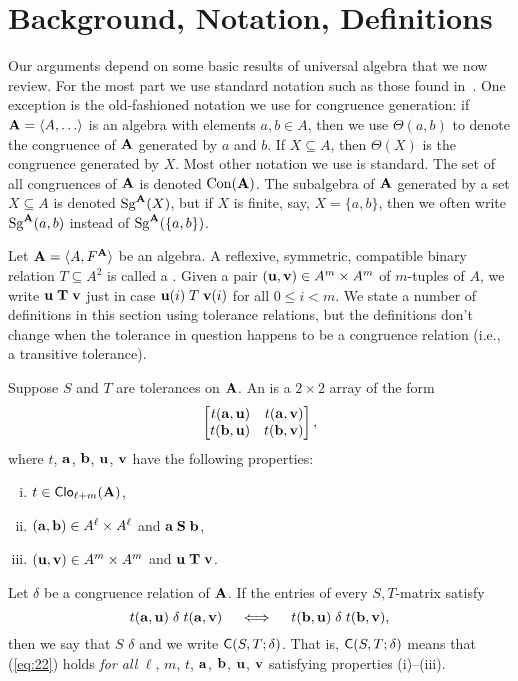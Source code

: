 \section{Background, Notation, Definitions}
\label{sec:definitions}
Our arguments depend on some basic results of universal algebra that we now review.
For the most part we use standard notation such as those found in~\cite{MR2839398}.
One exception is the old-fashioned notation we use for
congruence generation:
if $\bA =\<A, \dots\>$ is an algebra with elements 
$a, b \in A$, then we use $\Theta(a,b)$ to denote
the congruence of $\mathbf{A}$ generated by $a$ and $b$. If $X\subseteq A$,
then $\Theta(X)$ is the congruence generated by $X$.  
\renewcommand{\Cg}{\ensuremath{\Theta}}
Most other notation we use is standard.  The set of all congruences of $\mathbf{A}$ is
denoted $\operatorname{Con}(\mathbf{A})$. The subalgebra of $\mathbf{A}$ generated by a set $X \subseteq A$ 
is denoted $\operatorname{Sg}^{\mathbf{A}}(X)$, but if $X$ is finite, say, $X = \{a,b\}$, then we
often write $\operatorname{Sg}^{\mathbf{A}}(a,b)$ instead of $\operatorname{Sg}^{\mathbf{A}}(\{a,b\})$.


Let $\mathbf{A} = \langle A, F^{\mathbf{A}}\rangle$ be an algebra.
A reflexive, symmetric, compatible binary relation $T\subseteq A^2$ is called a
.  
Given a pair $(\mathbf{u}, \mathbf{v}) \in A^m\times A^m$ of $m$-tuples of $A$, we write 
$\mathbf{u} \mathrel{\mathbf{T}} \mathbf{v}$ just in case $\mathbf{u}(i) \mathrel{T} \mathbf{v}(i)$ for all $0\leq i<m$. 
We state a number of definitions in this section using tolerance relations, but 
the definitions don't change when the tolerance in question happens to be
a congruence relation (i.e., a transitive tolerance).

Suppose $S$ and $T$ are tolerances on $\mathbf{A}$.  An  
is a $2\times 2$ array of the form
\[
\begin{bmatrix*}[r] t(\ba,\bu) & t(\ba,\bv)\\ t(\bb,\bu)&t(\bb,\bv)\end{bmatrix*},
\]
where $t$, $\mathbf{a}$, $\mathbf{b}$, $\mathbf{u}$, $\mathbf{v}$ have the following properties:
\begin{enumerate}[(i)] %
\item $t\in \operatorname{\mathsf{Clo}}_{\ell + m}(\mathbf{A})$,
\item $(\mathbf{a}, \mathbf{b})\in A^\ell\times A^\ell$ and $\mathbf{a} \mathrel{\mathbf{S}} \mathbf{b}$,
\item $(\mathbf{u}, \mathbf{v})\in A^m\times A^m$ and $\mathbf{u} \mathrel{\mathbf{T}} \mathbf{v}$.
\end{enumerate}
Let $\delta$ be a congruence relation of $\mathbf{A}$.
If the entries of every $S,T$-matrix satisfy
\begin{equation}
  \label{eq:22}
t(\ba,\bu) \mathrel{\delta} t(\ba,\bv)\quad \iff \quad t(\bb,\bu) \mathrel{\delta} t(\bb,\bv),
\end{equation}
then we say that $S$  $\delta$ and we write 
$\mathsf{C}(S, T; \delta)$.
That is, $\mathsf{C}(S, T; \delta)$  means that 
(\ref{eq:22}) holds \emph{for all}
$\ell$, $m$, $t$, $\mathbf{a}$, $\mathbf{b}$, $\mathbf{u}$, $\mathbf{v}$ satisfying properties (i)--(iii).

